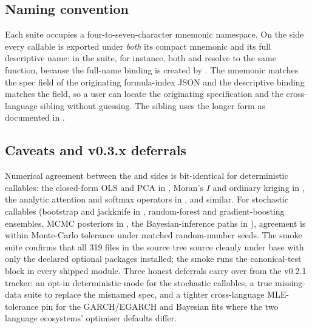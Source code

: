 \documentclass[article,shortnames,nojss]{jss}
\begin{document}
\subsection{Naming convention}\label{sec:textbook-naming}

Each suite occupies a four-to-seven-character mnemonic
namespace.  On the  side every callable is exported
under \emph{both} its compact mnemonic and its full descriptive
name: in the  suite, for instance, both
 and  resolve to
the same function, because the full-name binding is created by
.  The mnemonic matches
the spec  field of the originating formula-index JSON
and the descriptive binding matches the  field,
so a user can locate the originating specification and the
cross-language sibling without guessing.  The  sibling uses the longer form
 as documented in
\citet{Ruhela2026MoriePy}.

\subsection{Caveats and v0.3.x deferrals}\label{sec:textbook-caveats}

Numerical agreement between the  and 
sides is bit-identical for deterministic callables: the
closed-form OLS and PCA in , Moran's $I$
and ordinary kriging in , the analytic
attention and softmax operators in , and similar.  For stochastic callables
(bootstrap and jackknife in , random-forest
and gradient-boosting ensembles, MCMC posteriors in
, the Bayesian-inference paths in
), agreement is within Monte-Carlo
tolerance under matched random-number seeds.  The
 smoke suite confirms that all 319 
files in the source tree source cleanly under base 
with only the declared  optional packages
installed; the  smoke runs the 
canonical-test block in every shipped module.  Three honest
deferrals carry over from the v0.2.1 tracker: an opt-in
deterministic mode for the stochastic callables, a true
missing-data suite to replace the misnamed 
spec, and a tighter cross-language MLE-tolerance pin for the
GARCH/EGARCH and Bayesian fits where the two language
ecosystems' optimiser defaults differ.
\end{document}
